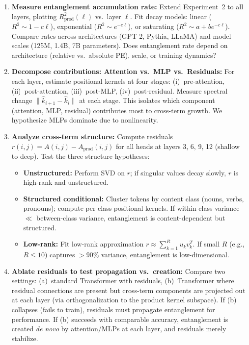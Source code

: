 \documentclass[11pt]{article}
\theoremstyle{definition}
\begin{document}
\begin{enumerate}
    \item \textbf{Measure entanglement accumulation rate:} Extend Experiment~2 to all layers, plotting $R^2_{\text{prod}}(\ell)$ vs.\ layer $\ell$. Fit decay models: linear ($R^2 \sim 1 - c\ell$), exponential ($R^2 \sim e^{-c\ell}$), or saturating ($R^2 \sim a + b e^{-c\ell}$). Compare rates across architectures (GPT-2, Pythia, LLaMA) and model scales (125M, 1.4B, 7B parameters). Does entanglement rate depend on architecture (relative vs.\ absolute PE), scale, or training dynamics?

    \item \textbf{Decompose contributions: Attention vs.\ MLP vs.\ Residuals:} For each layer, estimate positional kernels at four stages: (i)~pre-attention, (ii)~post-attention, (iii)~post-MLP, (iv)~post-residual. Measure spectral change $\|\hat{k}_{i+1} - \hat{k}_i\|$ at each stage. This isolates which component (attention, MLP, residual) contributes most to cross-term growth. We hypothesize MLPs dominate due to nonlinearity.

    \item \textbf{Analyze cross-term structure:} Compute residuals $r(i,j) = A(i,j) - A_{\text{prod}}(i,j)$ for all heads at layers 3, 6, 9, 12 (shallow to deep). Test the three structure hypotheses:
    \begin{itemize}
        \item \textbf{Unstructured:} Perform SVD on $r$; if singular values decay slowly, $r$ is high-rank and unstructured.
        \item \textbf{Structured conditional:} Cluster tokens by content class (nouns, verbs, pronouns); compute per-class positional kernels. If within-class variance $\ll$ between-class variance, entanglement is content-dependent but structured.
        \item \textbf{Low-rank:} Fit low-rank approximation $r \approx \sum_{k=1}^R u_k v_k^T$. If small $R$ (e.g., $R \leq 10$) captures $>90\%$ variance, entanglement is low-dimensional.
    \end{itemize}

    \item \textbf{Ablate residuals to test propagation vs.\ creation:} Compare two settings: (a)~standard Transformer with residuals, (b)~Transformer where residual connections are present but cross-term components are projected out at each layer (via orthogonalization to the product kernel subspace). If (b) collapses (fails to train), residuals must propagate entanglement for performance. If (b) succeeds with comparable accuracy, entanglement is created \emph{de novo} by attention/MLPs at each layer, and residuals merely stabilize.


\end{enumerate}
\end{document}
